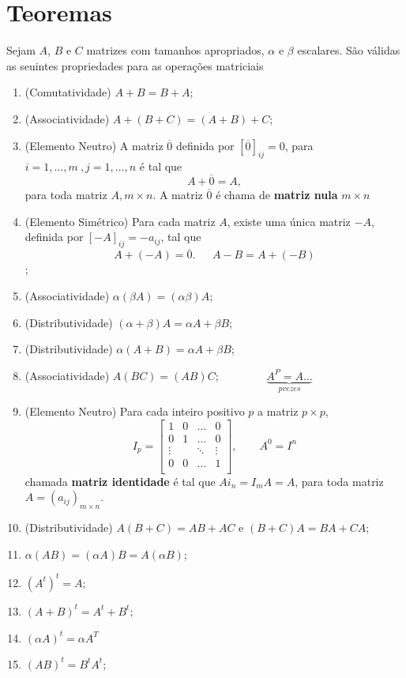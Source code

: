 \documentclass{article}
\begin{document}
\section{Teoremas}
Sejam $A$, $B$ e $C$ matrizes com tamanhos apropriados, $\alpha$ e $\beta$ escalares. São 
válidas as seuintes propriedades para as operações matriciais
\begin{enumerate}[label=(\alph*)]
    \item (Comutatividade) $A + B = B + A$;
    \item (Associatividade) $A + (B + C) = (A + B) + C$;
    \item (Elemento Neutro) A matriz $\overline{0}$ definida por $[\overline{0}]_{ij} = 0$, para $ i = 1,\hdots ,m \ ,j = 1,\hdots ,n$ é tal que
    $$ A + \overline{0} = A, $$
    para toda matriz $A, m \times n$. A matriz $\overline{0}$ é chama de \textbf{matriz nula} $m \times n$
    \item (Elemento Simétrico) Para cada matriz $A$, existe uma única matriz $-A$, definida por $[-A]_{ij} = -a_{ij}$, tal que 
    $$ A + (-A) = \overline{0}. \ \ \ \ \ \ \ A -B = A + (-B)$$ ;
    \item (Associatividade) $\alpha(\beta A) = (\alpha \beta )A$;
    \item (Distributividade) $(\alpha + \beta)A = \alpha A + \beta B $;
    \item (Distributividade) $\alpha(A + B) = \alpha A + \beta B $;
    \item (Associatividade) $A(BC) = (AB)C $; \ \ \ \ \ \ \ \ 
    $\underbrace{A^P = A \hdots}_{p vezes}$
    \item (Elemento Neutro) Para cada inteiro positivo $p$ a matriz $p \times p$,
    $$I_p = 
    \begin{bmatrix}
        1 & 0 & \hdots & 0 \\
        0 & 1 & \hdots & 0 \\
        \vdots & & \ddots & \vdots \\
        0 & 0 & \hdots & 1 \\
    \end{bmatrix}
    , \ \ \ \ \ \ \ \ \ A^0 = I^n
    $$
    chamada \textbf{matriz identidade} é tal que \newline
    $A i_n = I_mA = A$, para toda matriz $A = (a_{ij})_{m \times n}$.
    \item (Distributividade) $A(B+C) = AB + AC $ e $(B + C)A = BA + CA$;
    \item $\alpha(AB) = (\alpha A)B = A(\alpha B)$;
    \item $(A^t)^t = A$;
    \item $(A + B)^t = A^t + B^t$;
    \item $(\alpha A)^t = \alpha A^T$
    \item $(AB)^t = B^t A^t$;

\end{enumerate}
\end{document}
